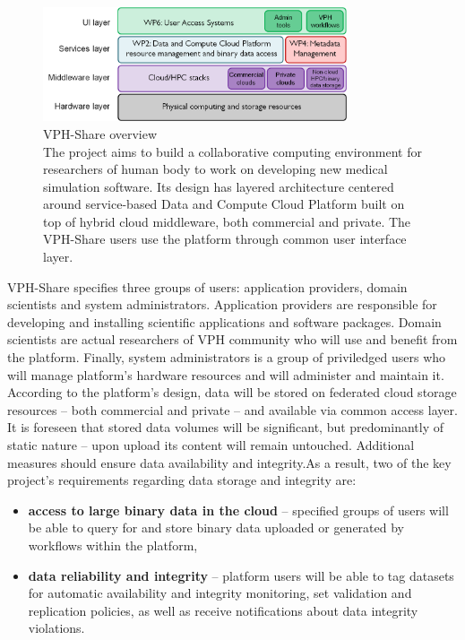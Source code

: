 \begin{figure}[h!]
	\centering
	\includegraphics[width=0.8\textwidth]{images/vph-high-level.png}
	\caption{VPH-Share overview\\
	The project aims to build a collaborative computing environment
	for researchers of human body to work on developing new medical simulation software.
	Its design has layered architecture centered around service-based Data and Compute
	Cloud Platform built on top of hybrid cloud middleware, both commercial and private. The VPH-Share
	users use the platform through common user interface layer.}
	\label{fig:dri-high-level}
\end{figure} 


VPH-Share specifies three groups of users:
application providers, domain scientists and system administrators. Application providers
are responsible for developing and installing scientific applications and software packages.
Domain scientists are actual researchers of VPH community who will use and benefit from 
the platform. Finally, system administrators is a group of priviledged users who will
manage platform's hardware resources and will administer and maintain it.\\

According to the platform's design, data will be stored on federated cloud storage resources --
both commercial and private -- and available via common access layer. It is foreseen that stored
data volumes will be significant, but predominantly of static nature -- upon upload its content will
remain untouched. Additional measures should ensure data availability and integrity.As a result, two
of the key project's requirements regarding data storage and integrity are:

\begin{itemize}
\item \textbf{access to large binary data in the cloud} -- specified groups of users will
be able to query for and store binary data uploaded or generated by workflows within the platform, 
\item \textbf{data reliability and integrity} -- platform users will be able to tag datasets
for automatic availability and integrity monitoring, set validation and replication policies,
as well as receive notifications about data integrity violations.
\end{itemize}


